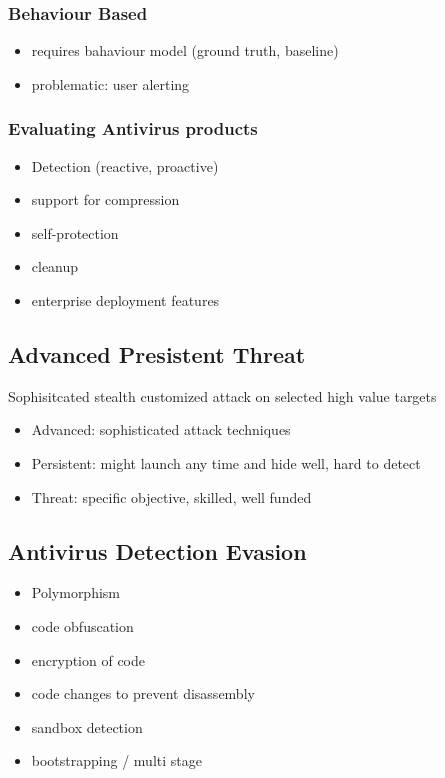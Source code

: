 \documentclass[fs, footer]{latex4ei}
\begin{document}
\begin{multicols*}{4}
     \subsubsection{Behaviour Based}
  \begin{itemize}
   	\item requires bahaviour model (ground truth, baseline)
   	\item problematic: user alerting
   \end{itemize} 

   \subsubsection{Evaluating Antivirus products}

   \begin{itemize}
    	\item Detection (reactive, proactive)
    	\item support for compression
    	\item self-protection
    	\item cleanup
    	\item enterprise deployment features
    \end{itemize} 

    \subsection{Advanced Presistent Threat}
    Sophisitcated stealth customized attack on selected high value targets
    \begin{itemize}
     	\item Advanced: sophisticated attack techniques
     	\item Persistent: might launch any time and hide well, hard to detect
     	\item Threat: specific objective, skilled, well funded
     \end{itemize} 

     \subsection{Antivirus Detection Evasion}
     \begin{itemize}
      	\item Polymorphism
      	\item code obfuscation
      	\item encryption of code
      	\item code changes to prevent disassembly
      	\item sandbox detection
      	\item bootstrapping / multi stage
      \end{itemize} 



\end{multicols*}
\end{document}
